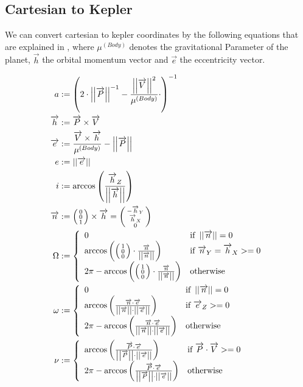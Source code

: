 \documentclass[11pt]{article}
\newcommand{\oa}[1]{\overrightarrow{#1}}
\newcommand{\Pos}{\oa{P}}
\newcommand{\Vel}{\oa{V}}
\newcommand{\absvec}[1]{\left|\left|{#1}\right|\right|}
\newcommand{\dddvec}[3]{\left(\begin{smallmatrix}{#1}\\{#2}\\{#3}\end{smallmatrix}\right)}
\begin{document}
\subsection{Cartesian to Kepler}

We can convert cartesian to kepler coordinates by the following
equations that are explained in \cite{RSCK}, where $\mu^{(Body)}$
denotes the gravitational Parameter of the planet, $\oa{h}$ the
 orbital momentum vector and $\oa{e}$ the
eccentricity vector.

\begin{align}
  a &:= \left(2\cdot\absvec{\Pos}^{-1} - \frac{\absvec{\Vel}^2}{\mu^{(Body)}}\cdot \right)^{-1}\\
  \oa{h} &:= \Pos \times \Vel\nonumber\\
  \oa{e} &:= \frac{\Vel\times \oa{h}}{\mu^{(Body)}} - \absvec{\Pos}\nonumber\\
  e &:= \absvec{\oa{e}}\\
  i &:= \arccos\left(\frac{\oa{h}_Z}{\absvec{\oa{h}}} \right)\\
  \oa{n} & := \dddvec{0}{0}{1} \times \oa{h} = \dddvec{-\oa{h}_Y}{\oa{h}_X}{0}\nonumber\\
  \Omega &:= \left\{
    \begin{array}{l l}
      0 & \textrm{if } \absvec{\oa{n}} = 0\\
      \arccos\left(\dddvec{1}{0}{0}\cdot\frac{\oa{n}}{\absvec{\oa{n}}} \right) & \textrm{if } \oa{n}_Y = \oa{h}_X >= 0\\
      2\pi - \arccos\left(\dddvec{1}{0}{0}\cdot\frac{\oa{n}}{\absvec{\oa{n}}} \right) & \textrm{otherwise}
    \end{array}
    \right.\\
  \omega & := \left\{
    \begin{array}{l l}
      0 & \textrm{if } \absvec{\oa{n}} = 0\\
      \arccos\left(\frac{\oa{n}\cdot\oa{e}}{\absvec{\oa{n}}\cdot\absvec{\oa{e}}} \right) & \textrm{if } \oa{e}_Z >= 0\\
      2\pi - \arccos\left(\frac{\oa{n}\cdot\oa{e}}{\absvec{\oa{n}}\cdot\absvec{\oa{e}}}\right) & \textrm{otherwise}
    \end{array}
    \right.\\
    \nu &:= \left\{
    \begin{array}{l l}
      \arccos\left(\frac{\Pos\cdot\oa{e}}{\absvec{\Pos}\cdot\absvec{\oa{e}}}\right) & \textrm{if } \Pos\cdot\Vel >= 0\\
      2\pi - \arccos\left(\frac{\Pos\cdot\oa{e}}{\absvec{\Pos}\cdot\absvec{\oa{e}}}\right) & \textrm{otherwise}
    \end{array}
    \right.
\end{align}
\end{document}
